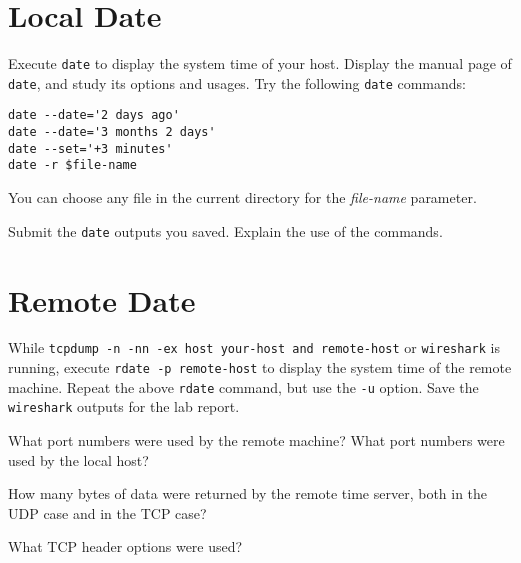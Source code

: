 \documentclass{../UTNetLab}
\begin{document}
\section{Local Date}
    Execute \lstinline{date} to display the system time of your host.
    Display the manual page of \lstinline{date}, and study its options and usages.
    Try the following \lstinline{date} commands: 

    \begin{lstlisting}[emph={$file-name}]
date --date='2 days ago'
date --date='3 months 2 days'
date --set='+3 minutes'
date -r $file-name
    \end{lstlisting}
    You can choose any file in the current directory for the \textit{file-name} parameter.
    
    \begin{report}
        \item Submit the \lstinline{date} outputs you saved.
            Explain the use of the commands.
    \end{report}

\section{Remote Date}
    While \lstinline[emph={your-host, remote-host}]{tcpdump -n -nn -ex host your-host and remote-host} or \lstinline{wireshark} is running, execute \lstinline[emph={your-host, remote-host}]{rdate -p remote-host} to display the system time of the remote machine.
    Repeat the above \lstinline{rdate} command, but use the \lstinline{-u} option.
    Save the \lstinline{wireshark} outputs for the lab report.

    \begin{report}
        \item What port numbers were used by the remote machine?
            What port numbers were used by the local host?
        
        \item How many bytes of data were returned by the remote time server, both in the UDP case and in the TCP case?
        
        \item What TCP header options were used?
    \end{report}
\end{document}
